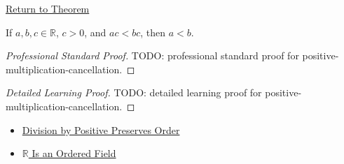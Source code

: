 \newpage
{}
\label{prf:positive-multiplication-cancellation}

\begin{remark*}[Return]
\hyperref[lem:positive-multiplication-cancellation]{Return to Theorem}
\end{remark*}

\begin{lemma*}
If $a,b,c\in\mathbb{R}$, $c>0$, and $ac<bc$, then $a<b$.
\end{lemma*}

\begin{proof}[Professional Standard Proof]
\LRAProofBodyStart
TODO: professional standard proof for positive-multiplication-cancellation.
\end{proof}

\begin{proof}[Detailed Learning Proof]
\LRAProofBodyStart
TODO: detailed learning proof for positive-multiplication-cancellation.
\end{proof}

\begin{remark*}
\end{remark*}

\begin{dependencies}
\begin{itemize}
  \item \hyperref[lem:division-by-positive-preserves-order]{Division by Positive Preserves Order}
  \item \hyperref[thm:r-is-an-ordered-field]{$\mathbb{R}$ Is an Ordered Field}
\end{itemize}
\end{dependencies}

\clearpage

